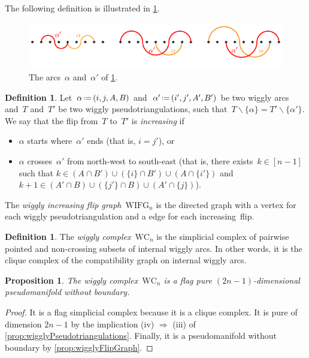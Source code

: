 \documentclass{amsart}
\newtheorem{proposition}[theorem]{Proposition}
\theoremstyle{definition}
\newtheorem{definition}[theorem]{Definition}
\newcommand{\ssm}{\smallsetminus} %
\newcommand{\eqdef}{\mbox{\,\raisebox{0.2ex}{\scriptsize\ensuremath{\mathrm:}}\ensuremath{=}\,}} %
\newcommand{\darkblue}{\color{darkblue}} %
\newcommand{\defn}[1]{\textsl{\darkblue #1}} %
\newcommand{\wigglyComplex}{\mathrm{WC}} %
\newcommand{\wigglyIncreasingFlipGraph}{\mathrm{WIFG}} %
\begin{document}
The following definition is illustrated in \cref{fig:incompatible2}.
%
\begin{figure}
\centerline{\includegraphics[scale=1.3]{incompatible2}}
\caption{The arcs~$\alpha$ and~$\alpha'$ of \cref{def:wigglyIncreasingFlipGraph}.}
\label{fig:incompatible2}
\end{figure}

\begin{definition}
\label{def:wigglyIncreasingFlipGraph}
Let~$\alpha \eqdef (i, j, A, B)$ and~$\alpha' \eqdef (i', j', A', B')$ be two wiggly arcs and~$T$ and~$T'$ be two wiggly pseudotriangulations, such that~$T \ssm \{\alpha\} = T' \ssm \{\alpha'\}$.
We say that the flip from~$T$ to~$T'$ is \defn{increasing} if 
\begin{itemize}
\item $\alpha$ starts where~$\alpha'$ ends (that is, $i = j'$), or 
\item $\alpha$ crosses~$\alpha'$ from north-west to south-east (that is, there exists~$k \in [n-1]$ such that $k \in (A \cap B') \cup (\{i\} \cap B') \cup (A \cap \{i'\})$ and~$k+1 \in (A' \cap B) \cup (\{j'\} \cap B) \cup (A' \cap \{j\})$).
\end{itemize}
The \defn{wiggly increasing flip graph}~$\wigglyIncreasingFlipGraph_n$ is the directed graph with a vertex for each wiggly pseudotriangulation and a edge for each increasing~flip.
\end{definition}

\begin{definition}
\label{def:wigglyComplex}
The \defn{wiggly complex}~$\wigglyComplex_n$ is the simplicial complex of pairwise pointed and non-crossing subsets of internal wiggly arcs.
In other words, it is the clique complex of the compatibility graph on internal wiggly arcs.
\end{definition}

\begin{proposition}
The wiggly complex~$\wigglyComplex_n$ is a flag pure $(2n-1)$-dimensional pseudomanifold without boundary.
\end{proposition}

\begin{proof}
It is a flag simplicial complex because it is a clique complex.
It is pure of dimension $2n-1$ by the implication (iv) $\Rightarrow$ (iii) of \cref{prop:wigglyPseudotriangulations}.
Finally, it is a pseudomanifold without boundary by \cref{prop:wigglyFlipGraph}.
\end{proof}
\end{document}

